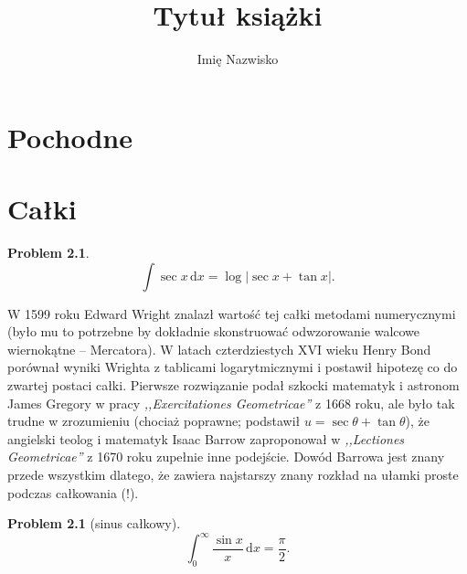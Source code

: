 \documentclass[9pt, twoside, a5paper, fleqn]{extbook}
\author{Imię Nazwisko}
\title{Tytuł książki}
\newcounter{counter}
\newtheorem{problemaux}[counter]{Problem}
\newenvironment{problem}{\begin{problemaux}}{\end{problemaux}}
\theoremstyle{remark}
\begin{document}






\raggedbottom

\chapter{Pochodne}


\chapter{Całki}





\begin{problem}
    \begin{equation}
        \int \sec x \,\mathrm{d} x = \log| \sec x + \tan x|.
    \end{equation}
\end{problem}

W 1599 roku Edward Wright znalazł wartość tej całki metodami numerycznymi (było mu to potrzebne by dokładnie skonstruować odwzorowanie walcowe wiernokątne -- Mercatora).
%
%
W latach czterdziestych XVI wieku Henry Bond porównał wyniki Wrighta z tablicami logarytmicznymi i postawił hipotezę co do zwartej postaci całki.
%
Pierwsze rozwiązanie podał szkocki matematyk i astronom James Gregory w pracy \emph{,,Exercitationes Geometricae''} z 1668 roku, ale było tak trudne w zrozumieniu (chociaż poprawne; podstawił $u = \sec \theta + \tan \theta$), że angielski teolog i matematyk Isaac Barrow zaproponował w \emph{,,Lectiones Geometricae''} z 1670 roku zupełnie inne podejście.
%
%
Dowód Barrowa jest znany przede wszystkim dlatego, że zawiera najstarszy znany rozkład na ułamki proste podczas całkowania (!).
%

\begin{problem}[sinus całkowy]
    \begin{equation}
        \int_0^\infty \frac {\sin x}{x} \,\mathrm{d} x = \frac \pi 2.
    \end{equation}
\end{problem}
\end{document}
